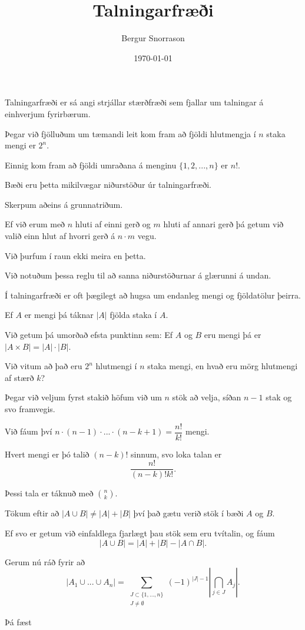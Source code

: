 \title{Talningarfræði}
\author{Bergur Snorrason}
\date{\today}



\frame{\titlepage}

{
	{
		\item<1-> Talningarfræði er sá angi strjállar stærðfræði sem fjallar um talningar á einhverjum fyrirbærum.
		\item<2-> Þegar við fjölluðum um tæmandi leit kom fram að fjöldi hlutmengja í $n$ staka mengi er $2^n$.
		\item<3-> Einnig kom fram að fjöldi umraðana á menginu $\{1, 2, ..., n\}$ er $n!$.
		\item<4-> Bæði eru þetta mikilvægar niðurstöður úr talningarfræði.
		\item<5-> Skerpum aðeins á grunnatriðum.
	}
}

{
	{
		\item<1-> Ef við erum með $n$ hluti af einni gerð og $m$ hluti af annari gerð þá getum við valið einn hlut af hvorri gerð á $n \cdot m$ vegu.
		\item<2-> Við þurfum í raun ekki meira en þetta.
		\item<3-> Við notuðum þessa reglu til að sanna niðurstöðurnar á glærunni á undan.
		\item<4-> Í talningarfræði er oft þægilegt að hugsa um endanleg mengi og fjöldatölur þeirra.
		\item<5-> Ef $A$ er mengi þá táknar $|A|$ fjölda staka í $A$.
		\item<6-> Við getum þá umorðað efsta punktinn sem: Ef $A$ og $B$ eru mengi þá er $|A \times B| = |A| \cdot |B|$.
	}
}

{
	{
		\item<1-> Við vitum að það eru $2^n$ hlutmengi í $n$ staka mengi, en hvað eru mörg hlutmengi af stærð $k$?
		\item<2-> Þegar við veljum fyrst stakið höfum við um $n$ stök að velja, síðan $n - 1$ stak og svo framvegis.
		\item<3-> Við fáum því $n \cdot (n - 1) \cdot ... \cdot (n - k + 1) = \dfrac{n!}{k!}$ mengi.
		\item<4-> Hvert mengi er þó talið $(n - k)!$ sinnum, svo loka talan er
		\[
			\frac{n!}{(n - k)!k!}.
		\]
		\item<5-> Þessi tala er táknuð með ${n \choose k}$.
	}
}

{
	{
		\item<1-> Tökum eftir að $|A \cup B| \neq |A| + |B|$ því það gætu verið stök í bæði $A$ og $B$.
		\item<2-> Ef svo er getum við einfaldlega fjarlægt þau stök sem eru tvítalin, og fáum
		\[
			|A \cup B| = |A| + |B| - |A \cap B|.
		\]
		\item<3-> Gerum nú ráð fyrir að
		\[
			|A_1 \cup ... \cup A_n| = \sum_{\substack{J \subset \{1, ..., n\} \\ J \neq \emptyset}} (-1)^{|J| - 1} \left | \bigcap_{j \in J} A_j \right |.
		\]
		\item<4-> Þá fæst
	}
}

